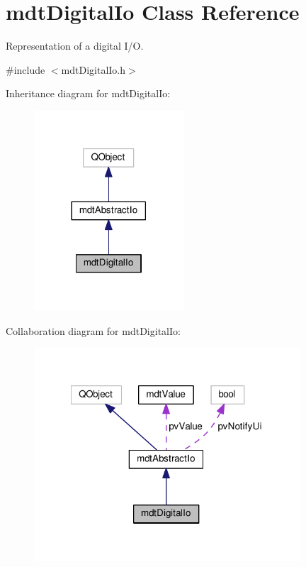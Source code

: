 \hypertarget{classmdt_digital_io}{\section{mdt\-Digital\-Io Class Reference}
\label{classmdt_digital_io}
}


Representation of a digital I/\-O.  




{\ttfamily \#include $<$mdt\-Digital\-Io.\-h$>$}



Inheritance diagram for mdt\-Digital\-Io\-:\nopagebreak
\begin{figure}[H]
\begin{center}
\leavevmode
\includegraphics[width=158pt]{classmdt_digital_io__inherit__graph}
\end{center}
\end{figure}


Collaboration diagram for mdt\-Digital\-Io\-:\nopagebreak
\begin{figure}[H]
\begin{center}
\leavevmode
\includegraphics[width=282pt]{classmdt_digital_io__coll__graph}
\end{center}
\end{figure}
